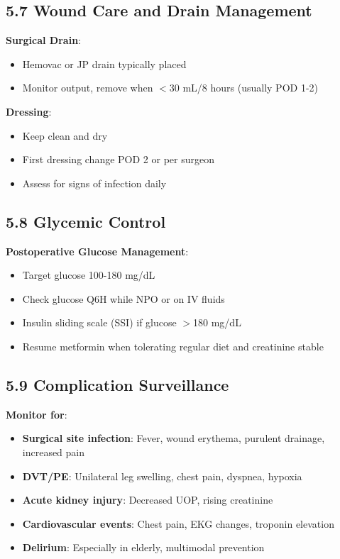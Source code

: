 \documentclass[11pt,letterpaper]{article}
\begin{document}
\subsection*{5.7 Wound Care and Drain Management}

\textbf{Surgical Drain}:
\begin{itemize}[leftmargin=*]
    \item Hemovac or JP drain typically placed
    \item Monitor output, remove when $<$30 mL/8 hours (usually POD 1-2)
\end{itemize}

\textbf{Dressing}:
\begin{itemize}[leftmargin=*]
    \item Keep clean and dry
    \item First dressing change POD 2 or per surgeon
    \item Assess for signs of infection daily
\end{itemize}

\subsection*{5.8 Glycemic Control}

\textbf{Postoperative Glucose Management}:
\begin{itemize}[leftmargin=*]
    \item Target glucose 100-180 mg/dL
    \item Check glucose Q6H while NPO or on IV fluids
    \item Insulin sliding scale (SSI) if glucose $>$180 mg/dL
    \item Resume metformin when tolerating regular diet and creatinine stable
\end{itemize}

\subsection*{5.9 Complication Surveillance}

\textbf{Monitor for}:
\begin{itemize}[leftmargin=*]
    \item \textbf{Surgical site infection}: Fever, wound erythema, purulent drainage, increased pain
    \item \textbf{DVT/PE}: Unilateral leg swelling, chest pain, dyspnea, hypoxia
    \item \textbf{Acute kidney injury}: Decreased UOP, rising creatinine
    \item \textbf{Cardiovascular events}: Chest pain, EKG changes, troponin elevation
    \item \textbf{Delirium}: Especially in elderly, multimodal prevention
\end{itemize}
\end{document}

